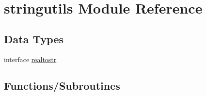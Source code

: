 \hypertarget{namespacestringutils}{}\section{stringutils Module Reference}
\label{namespacestringutils}
\subsection*{Data Types}
\begin{DoxyCompactItemize}
\item 
interface \mbox{\hyperlink{interfacestringutils_1_1realtostr}{realtostr}}
\end{DoxyCompactItemize}
\subsection*{Functions/\+Subroutines}
